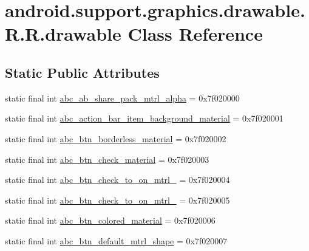 \hypertarget{classandroid_1_1support_1_1graphics_1_1drawable_1_1_r_1_1drawable}{
\section{android.support.graphics.drawable.R.R.drawable Class Reference}
\label{classandroid_1_1support_1_1graphics_1_1drawable_1_1_r_1_1drawable}
}
\subsection*{Static Public Attributes}
\begin{CompactItemize}
\item 
static final int \hyperlink{classandroid_1_1support_1_1graphics_1_1drawable_1_1_r_1_1drawable_bc80c836f80a7c5e3179c76753468764}{abc\_\-ab\_\-share\_\-pack\_\-mtrl\_\-alpha} = 0x7f020000
\item 
static final int \hyperlink{classandroid_1_1support_1_1graphics_1_1drawable_1_1_r_1_1drawable_b2bc870fabfbe5cb389b029c434a4670}{abc\_\-action\_\-bar\_\-item\_\-background\_\-material} = 0x7f020001
\item 
static final int \hyperlink{classandroid_1_1support_1_1graphics_1_1drawable_1_1_r_1_1drawable_2bfab9192a110c711cfbe3637db4740e}{abc\_\-btn\_\-borderless\_\-material} = 0x7f020002
\item 
static final int \hyperlink{classandroid_1_1support_1_1graphics_1_1drawable_1_1_r_1_1drawable_a1418b22f9f286cbb1bd4ea0dc55d882}{abc\_\-btn\_\-check\_\-material} = 0x7f020003
\item 
static final int \hyperlink{classandroid_1_1support_1_1graphics_1_1drawable_1_1_r_1_1drawable_6405ba357173fead376c53bbffd120b7}{abc\_\-btn\_\-check\_\-to\_\-on\_\-mtrl\_} = 0x7f020004
\item 
static final int \hyperlink{classandroid_1_1support_1_1graphics_1_1drawable_1_1_r_1_1drawable_dd6a7af7abfe3501d6edcbeee339c22d}{abc\_\-btn\_\-check\_\-to\_\-on\_\-mtrl\_} = 0x7f020005
\item 
static final int \hyperlink{classandroid_1_1support_1_1graphics_1_1drawable_1_1_r_1_1drawable_1ee347bad0b4aabf00dd68c52091ac04}{abc\_\-btn\_\-colored\_\-material} = 0x7f020006
\item 
static final int \hyperlink{classandroid_1_1support_1_1graphics_1_1drawable_1_1_r_1_1drawable_f1dfba3f343450224a28c3d680efb03e}{abc\_\-btn\_\-default\_\-mtrl\_\-shape} = 0x7f020007

\end{CompactItemize}
